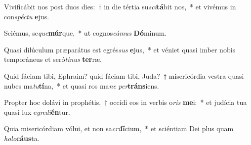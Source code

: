 \item Vivificábit nos post duos dies:~† in die tértia su\textit{sci}\textbf{tá}bit nos,~* et vivémus in con\textit{spéc}\textit{tu} \textbf{e}jus.
\item Sciémus, se\textit{que}\textbf{múr}que,~* ut cognos\textit{cá}\textit{mus} \textbf{Dó}minum.
\item Quasi dilúculum præparátus est egrés\textit{sus} \textbf{e}jus,~* et véniet quasi imber nobis temporáneus et seró\textit{ti}\textit{nus} \textbf{ter}ræ.
\item Quid fáciam tibi, Ephraim? quid fáciam tibi, Juda?~† misericórdia vestra quasi nubes ma\textit{tu}\textbf{tí}na,~* et quasi ros ma\textit{ne} \textit{per}\textbf{tráns}iens.
\item Propter hoc dolávi in prophétis,~† occídi eos in verbis o\textit{ris} \textbf{me}i:~* et judícia tua quasi lux e\textit{gre}\textit{di}\textbf{én}tur.
\item Quia misericórdiam vólui, et non sa\textit{cri}\textbf{fí}cium,~* et sciéntiam Dei plus quam \textit{ho}\textit{lo}\textbf{cáus}ta.
